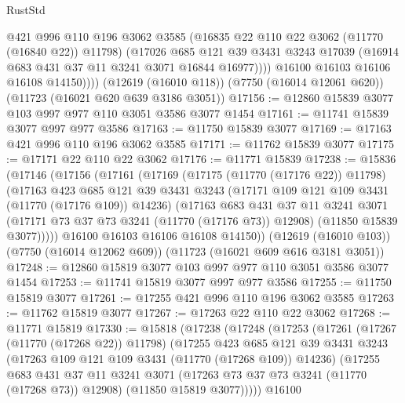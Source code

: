 \begin{lexlean}{RustStd}
\begin{coremodule}
                @421
                @996
                @110
                @196
                @3062
                @3585
                (@16835 @22 @110 @22 @3062 (@11770 (@16840 @22)) @11798)
                (@17026
                  @685
                  @121
                  @39
                  @3431
                  @3243
                  @17039
                  (@16914 @683 @431 @37 @11 @3241 @3071 @16844 @16977))))
            @16100
            @16103
            @16106
            @16108
            @14150))))
    (@12619 (@16010 @118))
    (@7750 (@16014 @12061 @620))
    (@11723 (@16021 @620 @639 @3186 @3051))
@17156 := @12860 @15839 @3077 @103 @997 @977 @110 @3051 @3586 @3077 @1454
@17161 := @11741 @15839 @3077 @997 @977 @3586
@17163 := @11750 @15839 @3077
@17169 := @17163 @421 @996 @110 @196 @3062 @3585
@17171 := @11762 @15839 @3077
@17175 := @17171 @22 @110 @22 @3062
@17176 := @11771 @15839
@17238 := @15836
    (@17146
      (@17156
        (@17161
          (@17169
            (@17175 (@11770 (@17176 @22)) @11798)
            (@17163
              @423
              @685
              @121
              @39
              @3431
              @3243
              (@17171 @109 @121 @109 @3431 (@11770 (@17176 @109)) @14236)
              (@17163
                @683
                @431
                @37
                @11
                @3241
                @3071
                (@17171 @73 @37 @73 @3241 (@11770 (@17176 @73)) @12908)
                (@11850 @15839 @3077)))))
        @16100
        @16103
        @16106
        @16108
        @14150))
    (@12619 (@16010 @103))
    (@7750 (@16014 @12062 @609))
    (@11723 (@16021 @609 @616 @3181 @3051))
@17248 := @12860 @15819 @3077 @103 @997 @977 @110 @3051 @3586 @3077 @1454
@17253 := @11741 @15819 @3077 @997 @977 @3586
@17255 := @11750 @15819 @3077
@17261 := @17255 @421 @996 @110 @196 @3062 @3585
@17263 := @11762 @15819 @3077
@17267 := @17263 @22 @110 @22 @3062
@17268 := @11771 @15819
@17330 := @15818
    (@17238
      (@17248
        (@17253
          (@17261
            (@17267 (@11770 (@17268 @22)) @11798)
            (@17255
              @423
              @685
              @121
              @39
              @3431
              @3243
              (@17263 @109 @121 @109 @3431 (@11770 (@17268 @109)) @14236)
              (@17255
                @683
                @431
                @37
                @11
                @3241
                @3071
                (@17263 @73 @37 @73 @3241 (@11770 (@17268 @73)) @12908)
                (@11850 @15819 @3077)))))
        @16100

\end{coremodule}
\end{lexlean}
